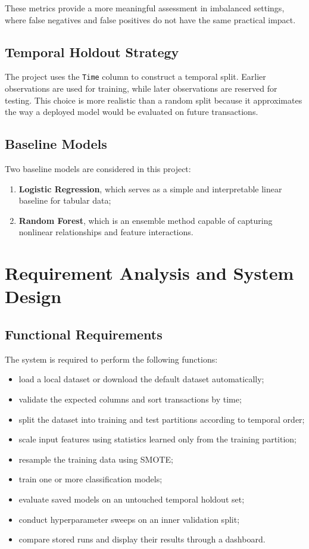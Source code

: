 \documentclass[12pt,a4paper]{report}
\begin{document}
These metrics provide a more meaningful assessment in imbalanced settings, where false negatives and false positives do not have the same practical impact.

\section{Temporal Holdout Strategy}
The project uses the \texttt{Time} column to construct a temporal split. Earlier observations are used for training, while later observations are reserved for testing. This choice is more realistic than a random split because it approximates the way a deployed model would be evaluated on future transactions.

\section{Baseline Models}
Two baseline models are considered in this project:
\begin{enumerate}
    \item \textbf{Logistic Regression}, which serves as a simple and interpretable linear baseline for tabular data;
    \item \textbf{Random Forest}, which is an ensemble method capable of capturing nonlinear relationships and feature interactions.
\end{enumerate}

\chapter{Requirement Analysis and System Design}
\section{Functional Requirements}
The system is required to perform the following functions:
\begin{itemize}
    \item load a local dataset or download the default dataset automatically;
    \item validate the expected columns and sort transactions by time;
    \item split the dataset into training and test partitions according to temporal order;
    \item scale input features using statistics learned only from the training partition;
    \item resample the training data using SMOTE;
    \item train one or more classification models;
    \item evaluate saved models on an untouched temporal holdout set;
    \item conduct hyperparameter sweeps on an inner validation split;
    \item compare stored runs and display their results through a dashboard.
\end{itemize}
\end{document}
